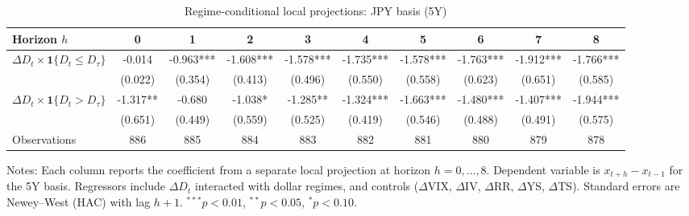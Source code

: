 \begin{table}[!htbp]\centering
\caption{Regime-conditional local projections: JPY basis (5Y)}
\label{tab:lp_jpy_5y}
\begin{tabular}{lccccccccc}
\toprule
Horizon $h$ & 0 & 1 & 2 & 3 & 4 & 5 & 6 & 7 & 8 \\
\midrule
$\Delta D_t \times \mathbf{1}\{D_t \le D_\tau\}$ & -0.014 & -0.963*** & -1.608*** & -1.578*** & -1.735*** & -1.578*** & -1.763*** & -1.912*** & -1.766*** \\
  & (0.022) & (0.354) & (0.413) & (0.496) & (0.550) & (0.558) & (0.623) & (0.651) & (0.585) \\
$\Delta D_t \times \mathbf{1}\{D_t > D_\tau\}$ & -1.317** & -0.680 & -1.038* & -1.285** & -1.324*** & -1.663*** & -1.480*** & -1.407*** & -1.944*** \\
  & (0.651) & (0.449) & (0.559) & (0.525) & (0.419) & (0.546) & (0.488) & (0.491) & (0.575) \\
\midrule
Observations & 886 & 885 & 884 & 883 & 882 & 881 & 880 & 879 & 878 \\
\bottomrule
\end{tabular}
\begin{flushleft}\footnotesize Notes: Each column reports the coefficient from a separate local projection at horizon $h=0,\dots,8$. Dependent variable is $x_{t+h}-x_{t-1}$ for the 5Y basis. Regressors include $\Delta D_t$ interacted with dollar regimes, and controls ($\Delta$VIX, $\Delta$IV, $\Delta$RR, $\Delta$YS, $\Delta$TS). Standard errors are Newey--West (HAC) with lag $h+1$. $^{***}p<0.01$, $^{**}p<0.05$, $^{*}p<0.10$.\end{flushleft}
\end{table}
